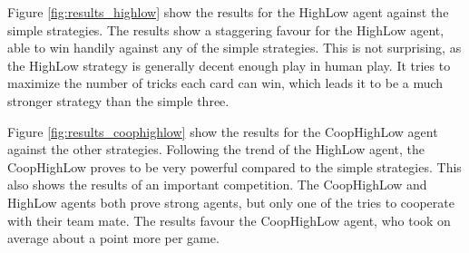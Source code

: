 Figure \ref{fig:results_highlow} show the results for the HighLow agent against the simple strategies. The results show a staggering
favour for the HighLow agent, able to win handily against any of the simple strategies. This is not surprising, as the HighLow strategy
is generally decent enough play in human play. It tries to maximize the number of tricks each card can win, which leads it to be
a much stronger strategy than the simple three.

Figure \ref{fig:results_coophighlow} show the results for the CoopHighLow agent against the other strategies. Following the trend of 
the HighLow agent, the CoopHighLow proves to be very powerful compared to the simple strategies. This also shows the results of an
important competition. The CoopHighLow and HighLow agents both prove strong agents, but only one of the tries to cooperate with
their team mate. The results favour the CoopHighLow agent, who took on average about a point more per game.

